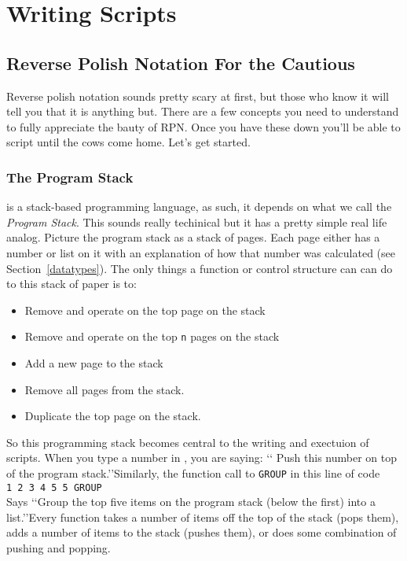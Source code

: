 \chapter{Writing Scripts}
\label{writingScripts}

\section{Reverse Polish Notation For the Cautious}
\label{polishNotation}
Reverse polish notation sounds pretty scary at first, but those who know it
will tell you that it is anything but. There are a few concepts you need to
understand to fully appreciate the bauty of RPN. Once you have these down
you'll be able to script until the cows come home. Let's get started.

\subsection*{The Program Stack}
\progLogo is a stack-based programming language, as such, it depends on what
we call the \emph{Program Stack}. This sounds really techinical but it has a
pretty simple real life analog. Picture the program stack as a stack of pages. Each page
either has a number or list on it with an explanation of how that number was
calculated (see Section~\ref{datatypes}). The only things a function or
control structure can can do to this stack of paper is to:

\begin{itemize}
\item Remove and operate on the top page on the stack
\item Remove and operate on the top \texttt{n} pages on the stack
\item Add a new page to the stack
\item Remove all pages from the stack.
\item Duplicate the top page on the stack.
\end{itemize}

So this programming stack becomes central to the writing and exectuion of
scripts. When you type a number in \progLogo, you are saying: \lq\lq
Push this number on top of the program stack.\rq\rq Similarly, the function
call to \texttt{GROUP} in this line of code\\
\indent\texttt{1 2 3 4 5 5 GROUP}\\
Says \lq\lq Group the top five items on the program stack (below the first)
into a list.\rq\rq Every function takes a number of items off the top of the
stack (pops them), adds a number of items to the stack (pushes them), or does
some combination of pushing and popping.

